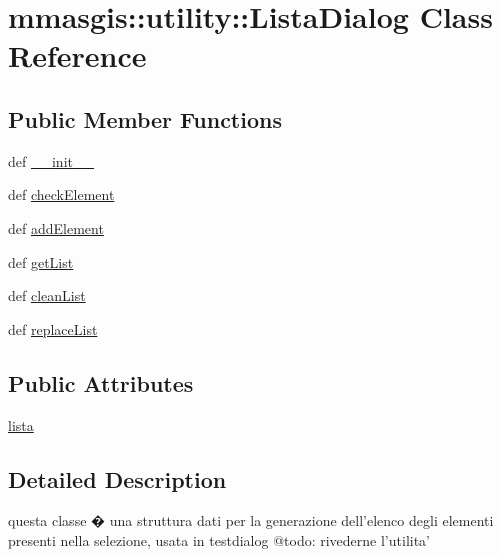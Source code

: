 \hypertarget{classmmasgis_1_1utility_1_1ListaDialog}{
\section{mmasgis::utility::ListaDialog Class Reference}
\label{classmmasgis_1_1utility_1_1ListaDialog}
}
\subsection*{Public Member Functions}
\begin{DoxyCompactItemize}
\item 
def \hyperlink{classmmasgis_1_1utility_1_1ListaDialog_add71a9d030edb7158f0286eaece342b0}{\_\-\_\-init\_\-\_\-}
\item 
def \hyperlink{classmmasgis_1_1utility_1_1ListaDialog_a0ea95c8d5f4edbd453616562d728c859}{checkElement}
\item 
def \hyperlink{classmmasgis_1_1utility_1_1ListaDialog_a7117edb268fb6e8f184712f3c32ed85b}{addElement}
\item 
def \hyperlink{classmmasgis_1_1utility_1_1ListaDialog_a65917c0d30a5433e2d4723145f96ce77}{getList}
\item 
def \hyperlink{classmmasgis_1_1utility_1_1ListaDialog_a0e6cdd01f1d1117f1ffaa8fa3b372c3c}{cleanList}
\item 
def \hyperlink{classmmasgis_1_1utility_1_1ListaDialog_a8b1fb89659e22a1eb4c2a0043d7aba9c}{replaceList}
\end{DoxyCompactItemize}
\subsection*{Public Attributes}
\begin{DoxyCompactItemize}
\item 
\hyperlink{classmmasgis_1_1utility_1_1ListaDialog_afbfe730c4dcdf50058f2eb7b5ab26df4}{lista}
\end{DoxyCompactItemize}


\subsection{Detailed Description}
\begin{DoxyVerb}
questa classe � una struttura dati per la generazione dell'elenco degli elementi presenti nella selezione,  usata in testdialog
@todo: rivederne l'utilita'
\end{DoxyVerb}
 


